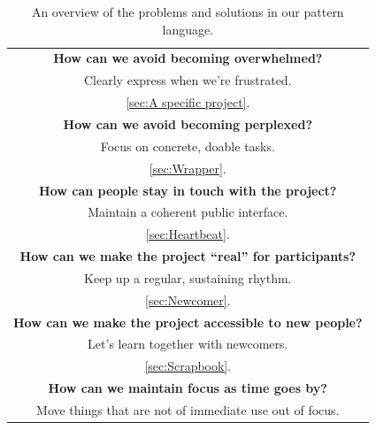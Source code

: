 \begin{table}
{\begin{tabularx}{\textwidth}{|C|}
\hline
\vspace{.01em}
\textbf{How can we avoid becoming overwhelmed?}\\
Clearly express when we're frustrated.
\vspace{.4em}\\
\hline
 \color{Black} \ref{sec:A specific project}. \vspace{.4em}\\
\hline
\vspace{.01em}
\textbf{How can we avoid becoming perplexed?}\\
Focus on concrete, doable tasks.
\vspace{.4em}\\
\hline
 \color{Black} \ref{sec:Wrapper}. \vspace{.4em}\\
\hline
\vspace{.01em}
\textbf{How can people stay in touch with the project?}\\
Maintain a coherent public interface.
\vspace{.4em}\\
\hline
 \color{Black} \ref{sec:Heartbeat}. \vspace{.4em}\\
\hline
\vspace{.01em}
\textbf{How can we make the project ``real'' for participants?}\\
Keep up a regular, sustaining rhythm.
\vspace{.4em}\\
\hline
 \color{Black} \ref{sec:Newcomer}. \vspace{.4em}\\
\hline
\vspace{.01em}
\textbf{How can we make the project accessible to new people?}\\
Let's learn together with newcomers.
\vspace{.4em}\\
\hline
 \color{Black} \ref{sec:Scrapbook}. \vspace{.4em}\\
\hline
\vspace{.01em}
\textbf{How can we maintain focus as time goes by?}\\
Move things that are not of immediate use out of focus.
\vspace{.4em}\\
\hline
\end{tabularx}
}
\caption{An overview of the problems and solutions in our pattern language.\label{tab:core}}
\end{table}

